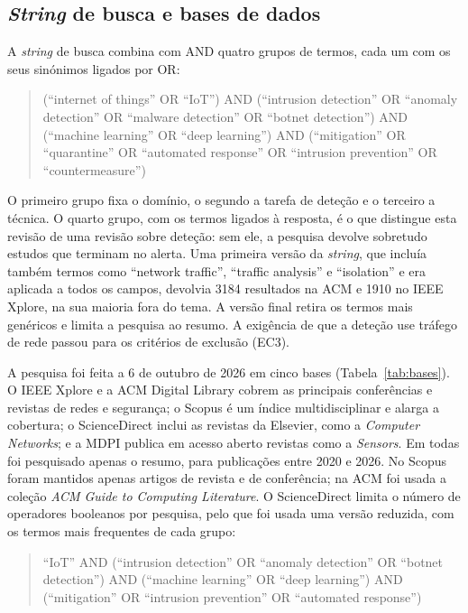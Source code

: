 \documentclass[conference,a4paper]{IEEEtran}
\begin{document}
\subsection{\textit{String} de busca e bases de dados}
A \textit{string} de busca combina com AND quatro grupos de termos, cada um com os seus
sinónimos ligados por OR:
\begin{quote}\footnotesize\raggedright
(``internet of things'' OR ``IoT'') AND (``intrusion detection'' OR ``anomaly detection'' OR
``malware detection'' OR ``botnet detection'') AND (``machine learning'' OR ``deep learning'')
AND (``mitigation'' OR ``quarantine'' OR ``automated response'' OR ``intrusion prevention'' OR ``countermeasure'')
\end{quote}
O primeiro grupo fixa o domínio, o segundo a tarefa de deteção e o terceiro a técnica. O
quarto grupo, com os termos ligados à resposta, é o que distingue esta revisão de uma
revisão sobre deteção: sem ele, a pesquisa devolve sobretudo estudos que terminam no
alerta. Uma primeira versão da \textit{string}, que incluía também termos como
``network traffic'', ``traffic analysis'' e ``isolation'' e era aplicada a todos os
campos, devolvia 3184 resultados na ACM e 1910 no IEEE Xplore, na sua maioria fora do
tema. A versão final retira os termos mais genéricos e limita a pesquisa ao resumo. A
exigência de que a deteção use tráfego de rede passou para os critérios de exclusão
(EC3).

A pesquisa foi feita a 6 de outubro de 2026 em cinco bases (Tabela~\ref{tab:bases}). O
IEEE Xplore e a ACM Digital Library cobrem as principais conferências e revistas de redes
e segurança; o Scopus é um índice multidisciplinar e alarga a cobertura; o ScienceDirect
inclui as revistas da Elsevier, como a \textit{Computer Networks}; e a MDPI publica em
acesso aberto revistas como a \textit{Sensors}. Em todas foi pesquisado apenas o resumo,
para publicações entre 2020 e 2026. No Scopus foram mantidos apenas artigos de revista e
de conferência; na ACM foi usada a coleção \textit{ACM Guide to Computing Literature}. O
ScienceDirect limita o número de operadores booleanos por pesquisa, pelo que foi usada
uma versão reduzida, com os termos mais frequentes de cada grupo:
\begin{quote}\footnotesize\raggedright
``IoT'' AND (``intrusion detection'' OR ``anomaly detection'' OR ``botnet detection'')
AND (``machine learning'' OR ``deep learning'') AND (``mitigation'' OR
``intrusion prevention'' OR ``automated response'')
\end{quote}
\end{document}
